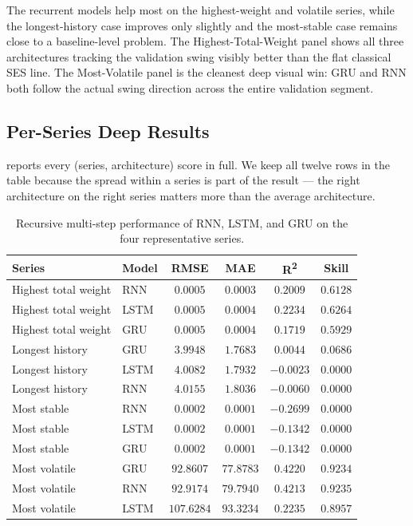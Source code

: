 The recurrent models help most on the highest-weight and volatile series, while the longest-history case improves only slightly and the most-stable case remains close to a baseline-level problem. The Highest-Total-Weight panel shows all three architectures tracking the validation swing visibly better than the flat classical SES line. The Most-Volatile panel is the cleanest deep visual win: GRU and RNN both follow the actual swing direction across the entire validation segment.

\subsection{Per-Series Deep Results}
\label{sec:deep:results}

 reports every (series, architecture) score in full. We keep all twelve rows in the table because the spread within a series is part of the result --- the right architecture on the right series matters more than the average architecture.

\begin{table}[h]
\centering
\caption{Recursive multi-step performance of RNN, LSTM, and GRU on the four representative series.}
\label{tab:deep_results_full}
\begin{tabular}{l l c c c c}
\toprule
Series & Model & RMSE & MAE & R\textsuperscript{2} & Skill \\
\midrule
Highest total weight & RNN  & $0.0005$  & $0.0003$  & $0.2009$  & $0.6128$ \\
Highest total weight & LSTM & $0.0005$  & $0.0004$  & $0.2234$  & $\mathbf{0.6264}$ \\
Highest total weight & GRU  & $0.0005$  & $0.0004$  & $0.1719$  & $0.5929$ \\
\midrule
Longest history      & GRU  & $3.9948$  & $1.7683$  & $0.0044$  & $\mathbf{0.0686}$ \\
Longest history      & LSTM & $4.0082$  & $1.7932$  & $-0.0023$ & $0.0000$ \\
Longest history      & RNN  & $4.0155$  & $1.8036$  & $-0.0060$ & $0.0000$ \\
\midrule
Most stable          & RNN  & $0.0002$  & $0.0001$  & $-0.2699$ & $0.0000$ \\
Most stable          & LSTM & $0.0002$  & $0.0001$  & $-0.1342$ & $0.0000$ \\
Most stable          & GRU  & $0.0002$  & $0.0001$  & $-0.1342$ & $0.0000$ \\
\midrule
Most volatile        & GRU  & $92.8607$ & $77.8783$ & $0.4220$  & $0.9234$ \\
Most volatile        & RNN  & $92.9174$ & $79.7940$ & $0.4213$  & $\mathbf{0.9235}$ \\
Most volatile        & LSTM & $107.6284$ & $93.3234$ & $0.2235$  & $0.8957$ \\
\bottomrule
\end{tabular}
\end{table}

